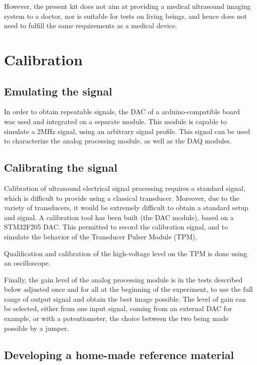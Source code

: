 \documentclass[letterpaper, 10 pt, conference]{ieeeconf} %
\begin{document}
However, the present kit does not aim at providing a medical ultrasound imaging system to a doctor, nor is suitable for tests on living beings, and hence does not need to fulfill the same requirements as a medical device. 


\section{Calibration}

\subsection{Emulating the signal}

In order to obtain repeatable signals, the DAC of a arduino-compatible board was used and integrated on a separate module. This module is capable to simulate a 2MHz signal, using an arbitrary signal profile. This signal can be used to characterize the analog processing module, as well as the DAQ modules. 

\subsection{Calibrating the signal}

Calibration of ultrasound electrical signal processing requires a standard signal, which is difficult to provide using a classical transducer. Moreover, due to the variety of transducers, it would be extremely difficult to obtain a standard setup and signal. A calibration tool has been built (the DAC module), based on a STM32F205 DAC. This permitted to record the calibration signal, and to simulate the behavior of the Transducer Pulser Module (TPM).

Qualification and calibration of the high-voltage level on the TPM is done using an oscilloscope.

Finally, the gain level of the analog processing module is in the tests described below adjusted once and for all at the beginning of the experiment, to use the full range of output signal and obtain the best image possible. The level of gain can be selected, either from one input signal, coming from an external DAC for example, or with a potentiometer, the choice between the two being made possible by a jumper.

\subsection{Developing a home-made reference material}
\end{document}
